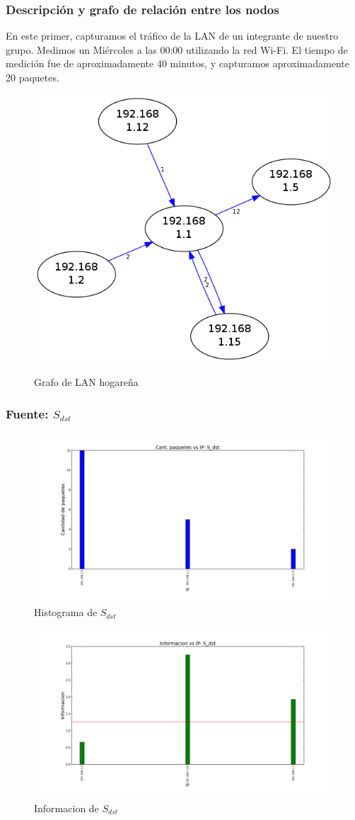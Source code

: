 \subsubsection{Descripción y grafo de relación entre los nodos}

En este primer, capturamos el tráfico de la LAN de un integrante de nuestro grupo. Medimos un Miércoles a las 00:00 utilizando la red Wi-Fi. El tiempo de medición fue de aproximadamente 40 minutos, y capturamos aproximadamente 20 paquetes.

\begin{figure}[H]
  \begin{center}
    \includegraphics[width=0.3\linewidth]{../imgs/red-hogarena_red.png}
    \label{fig:FedeGrafo}
    \caption{Grafo de LAN hogareña}
  \end{center}
\end{figure}

\subsubsection{Fuente: $S_{dst}$}

\begin{figure}[H]\centering
    \includegraphics[width=0.8\linewidth]{../imgs/red-hogarena_S_dst_hist.png}
    \caption{Histograma de $S_{dst}$}\label{fig:Fede-dst-hist}
\end{figure}

\begin{figure}[H]\centering
    \includegraphics[width=0.8\linewidth]{../imgs/red-hogarena_S_dst_info.png}
    \caption{Informacion de $S_{dst}$}\label{fig:Fede-dst-info}
\end{figure}

